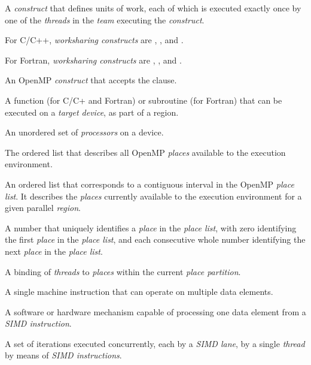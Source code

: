 \glossarydefstart
A \emph{construct} that defines units of work, each of which is executed 
exactly once by one of the \emph{threads} in the \emph{team} executing 
the \emph{construct}.

For C/C++, \emph{worksharing constructs} are , , 
and .

For Fortran, \emph{worksharing constructs} are , , 
 and .
\glossarydefend

\glossarydefstart
An OpenMP \emph{construct} that accepts the  clause.
\glossarydefend

\glossarydefstart
A function (for C/C+ and Fortran) or subroutine (for Fortran) that can be
executed on a \emph{target device}, as part of a  region.
\glossarydefend

\glossarydefstart
An unordered set of \emph{processors} on a device.
\glossarydefend

\glossarydefstart
The ordered list that describes all OpenMP \emph{places} available to 
the execution environment.
\glossarydefend

\glossarydefstart
An ordered list that corresponds to a contiguous interval in the OpenMP 
\emph{place list}. It describes the \emph{places} currently available to 
the execution environment for a given parallel \emph{region}.
\glossarydefend

\glossarydefstart
A number that uniquely identifies a \emph{place} in the \emph{place list}, 
with zero identifying the first \emph{place} in the \emph{place list}, and 
each consecutive whole number identifying the next \emph{place} in the 
\emph{place list}.
\glossarydefend

\glossarydefstart
A binding of \emph{threads} to \emph{places} within the current \emph{place partition}.
\glossarydefend

\glossarydefstart
A single machine instruction that can operate on multiple data elements.
\glossarydefend

\glossarydefstart
A software or hardware mechanism capable of processing one data element from a
\emph{SIMD instruction}.
\glossarydefend

\glossarydefstart
A set of iterations executed concurrently, each by a \emph{SIMD lane}, by 
a single \emph{thread} by means of \emph{SIMD instructions}.
\glossarydefend

